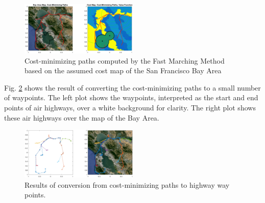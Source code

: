 \begin{figure}
	\centering
	\includegraphics[width=0.5\textwidth]{"fig/airHighway_results"}
	\caption{Cost-minimizing paths computed by the Fast Marching Method based on the assumed cost map of the San Francisco Bay Area}
	\label{fig:airHighway_results}
\end{figure}

Fig. \ref{fig:airHighway_sparse} shows the result of converting the cost-minimizing paths to a small number of waypoints. The left plot shows the waypoints, interpreted as the start and end points of air highways, over a white background for clarity. The right plot shows these air highways over the map of the Bay Area.

\begin{figure}
	\centering
	\includegraphics[width=0.5\textwidth]{"fig/airHighway_sparse"}
	\caption{Results of conversion from cost-minimizing paths to highway way points.}
	\label{fig:airHighway_sparse}
\end{figure}